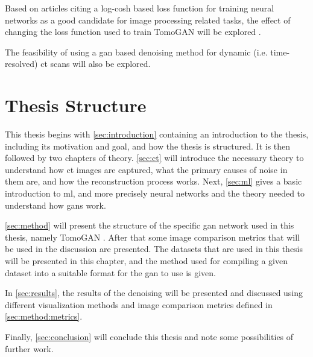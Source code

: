 Based on articles citing a log-cosh based loss function for training neural networks as a good candidate for image processing related tasks, the effect of changing the loss function used to train TomoGAN will be explored \cite{chen2019log,7797130}. 

The feasibility of using a \gls{gan} based denoising method for dynamic (i.e. time-resolved) \gls{ct} scans will also be explored. 

\section{Thesis Structure}
This thesis begins with \cref{sec:introduction} containing an introduction to the thesis, including its motivation and goal, and how the thesis is structured. It is then followed by two chapters of theory. \cref{sec:ct} will introduce the necessary theory to understand how \gls{ct} images are captured, what the primary causes of noise in them are, and how the reconstruction process works. Next, \cref{sec:ml} gives a basic introduction to \gls{ml}, and more precisely neural networks and the theory needed to understand how \gls{gan}s work. 

\cref{sec:method} will present the structure of the specific \gls{gan} network used in this thesis, namely TomoGAN \cite{liu2020tomogan}. After that some image comparison metrics that will be used in the discussion are presented. The datasets that are used in this thesis will be presented in this chapter, and the method used for compiling a given dataset into a suitable format for the \gls{gan} to use is given. 

In \cref{sec:results}, the results of the denoising will be presented and discussed using different visualization methods and image comparison metrics defined in \cref{sec:method:metrics}.

Finally, \cref{sec:conclusion} will conclude this thesis and note some possibilities of further work. 